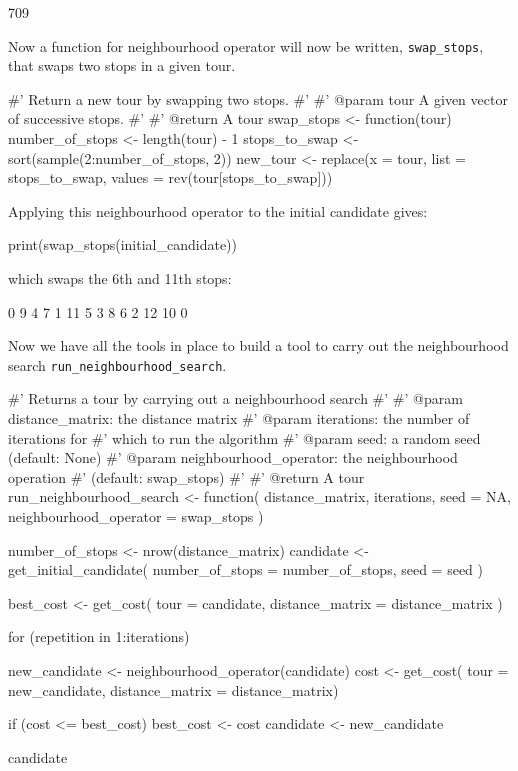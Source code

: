 \begin{Rout}
[1] 709
\end{Rout}

Now a function for neighbourhood operator will now be written,
\texttt{swap_stops}, that swaps two stops in a given tour.

\begin{Rin}
#' Return a new tour by swapping two stops.
#'
#' @param tour A given vector of successive stops.
#'
#' @return A tour
swap_stops <- function(tour){
    number_of_stops <- length(tour) - 1
    stops_to_swap <- sort(sample(2:number_of_stops, 2))
    new_tour <- replace(x = tour,
                        list = stops_to_swap,
                        values = rev(tour[stops_to_swap]))
    }
\end{Rin}

Applying this neighbourhood operator to the initial candidate gives:

\begin{Rin}
print(swap_stops(initial_candidate))
\end{Rin}

which swaps the 6th and 11th stops:

\begin{Rout}
 [1]  0  9  4  7  1 11  5  3  8  6  2 12 10  0
\end{Rout}

Now we have all the tools in place to build a tool to carry out the
neighbourhood search \texttt{run_neighbourhood_search}.

\begin{Rin}
#' Returns a tour by carrying out a neighbourhood search
#'
#' @param distance_matrix: the distance matrix
#' @param iterations: the number of iterations for
#'                    which to run the algorithm
#' @param seed: a random seed (default: None)
#' @param neighbourhood_operator: the neighbourhood operation
#'                                (default: swap_stops)
#'
#' @return A tour
run_neighbourhood_search <- function(
  distance_matrix,
  iterations,
  seed = NA,
  neighbourhood_operator = swap_stops
){
  number_of_stops <- nrow(distance_matrix)
  candidate <- get_initial_candidate(
    number_of_stops = number_of_stops,
    seed = seed
    )

  best_cost <- get_cost(
    tour = candidate,
    distance_matrix = distance_matrix
    )

  for (repetition in 1:iterations) {
    new_candidate <- neighbourhood_operator(candidate)
    cost <- get_cost(
        tour = new_candidate,
        distance_matrix = distance_matrix)

    if (cost <= best_cost) {
      best_cost <- cost
      candidate <- new_candidate
    }

  }
  candidate
}
\end{Rin}

